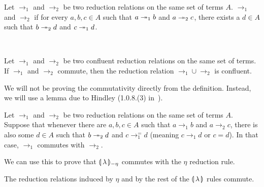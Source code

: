 \begin{definition}
  Let $\to_1$ and $\to_2$ be two reduction relations on the same set of
  terms $A$. $\to_1$ and $\to_2$  if for every $a,b,c \in A$
  such that $a \twoheadrightarrow_1 b$ and $a \twoheadrightarrow_2 c$, there exists a $d \in A$ such
  that $b \twoheadrightarrow_2 d$ and $c \twoheadrightarrow_1 d$.
\end{definition}

\begin{lemma}\label{lem:hindley-rosen}
  ~\cite{klop1992term}
  
  Let $\to_1$ and $\to_2$ be two confluent reduction relations on the same
  set of terms. If $\to_1$ and $\to_2$ commute, then the reduction relation
  $\to_1 \cup \to_2$ is confluent.
\end{lemma}

We will not be proving the commutativity directly from the
definition. Instead, we will use a lemma due to Hindley (1.0.8.(3)
in~\cite{klop1992term}).

\begin{lemma}\label{lem:commutativity}
  Let $\to_1$ and $\to_2$ be two reduction relations on the same set of
  terms $A$. Suppose that whenever there are $a,b,c \in A$ such that
  $a \to_1 b$ and $a \to_2 c$, there is also some $d \in A$ such that
  $b \twoheadrightarrow_2 d$ and $c \to_1^= d$ (meaning $c \to_1 d$ or $c = d$). In that
  case, $\to_1$ commutes with $\to_2$.~\cite{klop1992term}
\end{lemma}

We can use this to prove that $\llparenthesis \, \lambda \, \rrparenthesis_{-\eta}$ commutes with the
$\eta$ reduction rule.

\begin{lemma}\label{lem:eta-commutes}

  The reduction relations induced by $\eta$ and by the rest of the
  $\llparenthesis \, \lambda \, \rrparenthesis$ rules commute.
\end{lemma}

